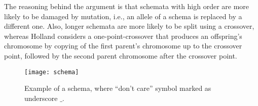 The reasoning behind the argument is that schemata with high order are more likely
to be damaged by mutation, i.e., an allele of a schema is replaced by a different one.
Also, longer schemata are more likely to be split using a crossover, whereas Holland
considers a one-point-crossover that produces an offspring’s chromosome by copying
of the first parent’s chromosome up to the crossover point, followed by the second parent chromosome after the crossover point.

\begin{figure}[h]
    \texttt{[image: schema]}
    \caption[Example of a schema]{Example of a schema, where “don’t care” symbol marked as underscore $\_$.}
    \label{fig:schema}
\end{figure}
